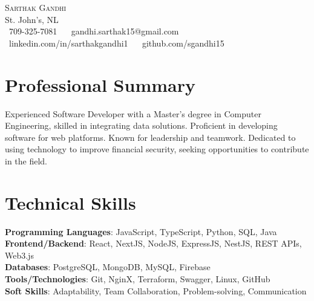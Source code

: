 \documentclass[letterpaper,11pt]{article}
\begin{document}
\begin{center}
    {\Huge \scshape Sarthak Gandhi} \\ \vspace{1pt}
    St. John's, NL \\ \vspace{1pt}
    \small \raisebox{-0.1\height}\faPhone\ 709-325-7081 ~ 
    {\raisebox{-0.2\height}\faEnvelope\  {gandhi.sarthak15@gmail.com}} ~ 
    {\raisebox{-0.2\height}\faLinkedin\ {linkedin.com/in/sarthakgandhi1}}  ~
    {\raisebox{-0.2\height}\faGithub\ {github.com/sgandhi15}}
    \vspace{-8pt}
\end{center}


\section{Professional Summary}
Experienced Software Developer with a Master’s degree in Computer Engineering, skilled in integrating data solutions. Proficient in developing software for web platforms. Known for leadership and teamwork. Dedicated to using technology to improve financial security, seeking opportunities to contribute in the field.
\vspace{-8pt}

\section{Technical Skills}
\begin{itemize}[leftmargin=0.15in, label={}]
\small{\item{
\textbf{Programming Languages}{: JavaScript, TypeScript, Python, SQL, Java} \\
\textbf{Frontend/Backend}{: React, NextJS, NodeJS, ExpressJS, NestJS, REST APIs, Web3.js} \\
\textbf{Databases}{: PostgreSQL, MongoDB, MySQL, Firebase} \\
\textbf{Tools/Technologies}{: Git, NginX, Terraform, Swagger, Linux, GitHub} \\
\textbf{Soft Skills}{: Adaptability, Team Collaboration, Problem-solving, Communication} \\
}}
\end{itemize}
\vspace{-16pt}

\end{document}
